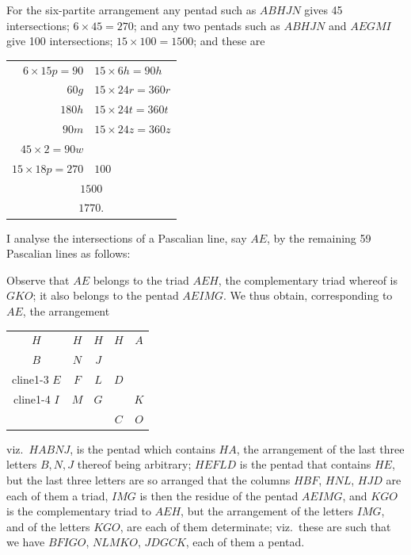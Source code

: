 \documentclass[11pt,a4paper]{article}
\theoremstyle{definition}
\begin{document}
For the six-partite arrangement any pentad such as $ABHJN$ gives 45 intersections; $6 \times 45 = 270$; and any two pentads such as $ABHJN$ and $AEGMI$ give 100 intersections; $15 \times 100 = 1500$; and these are
\begin{center}
\begin{tabular}{r@{\ }l}
$6 \times 15p = 90$ & $15 \times 6h = 90h$\\
$60g$ & $15 \times 24r = 360r$\\
$180h$ & $15 \times 24t = 360t$\\
$90m$ & $15 \times 24z = 360z$\\
$45 \times 2 = 90w$ & \\
\hline
$15 \times 18p = 270$ & $100$\\
\multicolumn{2}{c}{$1500$}\\
\multicolumn{2}{c}{$1770$.}
\end{tabular}
\end{center}

I analyse the intersections of a Pascalian line, say $AE$, by the remaining 59 Pascalian lines as follows:

Observe that $AE$ belongs to the triad $AEH$, the complementary triad whereof is $GKO$; it also belongs to the pentad $AEIMG$. We thus obtain, corresponding to $AE$, the arrangement
\begin{center}
\begin{tabular}{ccccc}
$H$ & $H$ & $H$ & $H$ & $A$\\
$B$ & $N$ & $J$ & & \\cline{1-3}
$E$ & $F$ & $L$ & $D$ & \\cline{1-4}
$I$ & $M$ & $G$ & & $K$\\
  &   &   & $C$ & $O$
\end{tabular}
\end{center}
viz.\ $HABNJ$, is the pentad which contains $HA$, the arrangement of the last three letters $B, N, J$ thereof being arbitrary; $HEFLD$ is the pentad that contains $HE$, but the last three letters are so arranged that the columns $HBF$, $HNL$, $HJD$ are each of them a triad, $IMG$ is then the residue of the pentad $AEIMG$, and $KGO$ is the complementary triad to $AEH$, but the arrangement of the letters $IMG$, and of the letters $KGO$, are each of them determinate; viz.\ these are such that we have $BFIGO$, $NLMKO$, $JDGCK$, each of them a pentad.

\newpage
\end{document}
